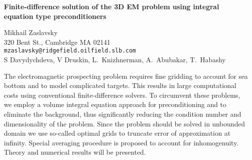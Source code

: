 \documentclass{report}
\begin{document}

\begin{center}
{\large
{\bf Finite-difference solution of the 3D EM problem
using integral equation type preconditioners}}

	Mikhail Zaslavsky \\
	320 Bent St., Cambridge MA 02141 \\
	{\tt mzaslavsky@ridgefield.oilfield.slb.com} \\
	S Davydychdeva, V Druskin,
	L.~Knizhnerman, A.~Abubakar, T.~Habashy
\end{center}
The electromagnetic prospecting problem requires fine
gridding to account for sea bottom and to model complicated
targets. This results in large computational costs using
conventional finite-difference solvers. To circumvent these
problems, we employ a volume integral equation approach for
preconditioning and to eliminate the background, thus
significantly reducing the condition number and
dimensionality of the problem. Since the problem should be
solved in unbounded domain we use so-called optimal grids to
truncate error of approximation at infinity. Special
averaging procedure is proposed to account for
inhomogenuity. Theory and numerical results will be
presented.


\end{document}
